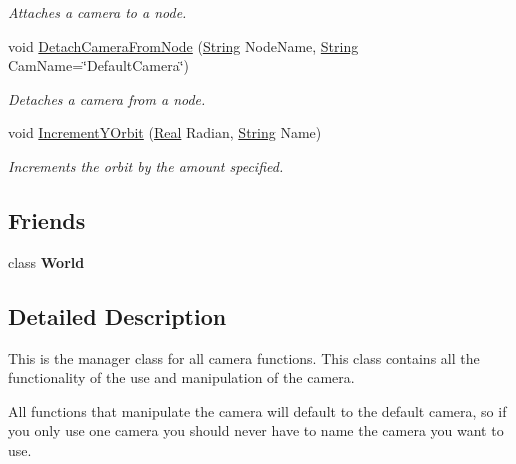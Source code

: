 \begin{DoxyCompactItemize}
\begin{DoxyCompactList}\small\item\em Attaches a camera to a node. \item\end{DoxyCompactList}\item 
void \hyperlink{classphys_1_1CameraManager_a5137bdb9dec706fa0fafec665d4f71c8}{DetachCameraFromNode} (\hyperlink{namespacephys_aa03900411993de7fbfec4789bc1d392e}{String} NodeName, \hyperlink{namespacephys_aa03900411993de7fbfec4789bc1d392e}{String} CamName=\char`\"{}DefaultCamera\char`\"{})
\begin{DoxyCompactList}\small\item\em Detaches a camera from a node. \item\end{DoxyCompactList}\item 
void \hyperlink{classphys_1_1CameraManager_a82001f0874a090717ced3fbe78ce795b}{IncrementYOrbit} (\hyperlink{namespacephys_af7eb897198d265b8e868f45240230d5f}{Real} Radian, \hyperlink{namespacephys_aa03900411993de7fbfec4789bc1d392e}{String} Name)
\begin{DoxyCompactList}\small\item\em Increments the orbit by the amount specified. \item\end{DoxyCompactList}\end{DoxyCompactItemize}
\subsection*{Friends}
\begin{DoxyCompactItemize}
\item 
\hypertarget{classphys_1_1CameraManager_a7b4bcdf992c21ae83363f25df05b1d25}{
class {\bfseries World}}
\label{d9/d91/classphys_1_1CameraManager_a7b4bcdf992c21ae83363f25df05b1d25}

\end{DoxyCompactItemize}


\subsection{Detailed Description}
This is the manager class for all camera functions. This class contains all the functionality of the use and manipulation of the camera. \par
 All functions that manipulate the camera will default to the default camera, so if you only use one camera you should never have to name the camera you want to use. 

